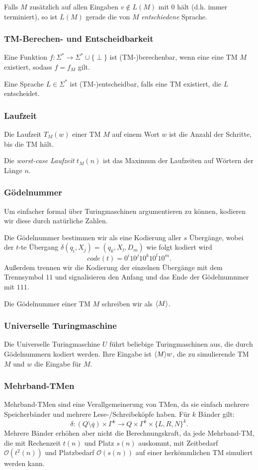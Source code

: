 \documentclass[a4paper,parskip=half*,DIV=7,fontsize=11pt]{scrartcl}
\DeclarePairedDelimiter\goedel{\langle}{\rangle}
\begin{document}
Falls $M$ zusätzlich auf allen Eingaben $v \notin L(M)$ mit 0 hält (d.h. immer terminiert), so ist $L(M)$ gerade die von $M$ \emph{entschiedene} Sprache.

\subsubsection{TM-Berechen- und Entscheidbarkeit}
Eine Funktion $f : \Sigma^* \to \Sigma^* \cup \{\perp\}$ ist (TM-)berechenbar, wenn eine eine TM $M$ existiert, sodass $f = f_M$ gilt.

Eine Sprache $L \in \Sigma^*$ ist (TM-)entscheidbar, falls eine TM existiert, die $L$ entscheidet.

\subsubsection{Laufzeit}

Die Laufzeit $T_M(w)$ einer TM $M$ auf einem Wort $w$ ist die Anzahl der Schritte, bis die TM hält.

Die \emph{worst-case Laufzeit} $t_M(n)$ ist das Maximum der Laufzeiten auf Wörtern der Länge $n$.

\subsubsection{Gödelnummer}
Um einfacher formal über Turingmaschinen argumentieren zu können, kodieren wir diese durch natürliche Zahlen.

Die Gödelnummer bestimmen wir als eine Kodierung aller $s$ Übergänge, wobei der $t$-te Übergang $\delta(q_i, X_j) = (q_k, X_l, D_m)$ wie folgt kodiert wird $$code(t) = 0^i 10^j 10^k 10^l 10^m.$$ Außerdem trennen wir die Kodierung der einzelnen Übergänge mit dem Trennsymbol $11$ und signalisieren den Anfang und das Ende der Gödelnumnmer mit $111$.

Die Gödelnummer einer TM $M$ schreiben wir als $\goedel{M}$.

\subsubsection{Universelle Turingmaschine}
Die Universelle Turingmaschine $U$ führt beliebige Turingmaschinen aus, die durch Gödelnummern kodiert werden. Ihre Eingabe ist $\goedel{M} w$, die zu simulierende TM $M$ und $w$ die Eingabe für $M$.

\subsubsection{Mehrband-TMen}
Mehrband-TMen sind eine Verallgemeinerung von TMen, da sie einfach mehrere Speicherbänder und mehrere Lese-/Schreibeköpfe haben. Für $k$ Bänder gilt: 
\[\delta : (Q \setminus \overline{q}) \times \Gamma^k \to Q \times \Gamma^k \times \{L,R,N\}^k.\]
Mehrere Bänder erhöhen aber nicht die Berechnungskraft, da jede Mehrband-TM, die mit Rechenzeit $t(n)$ und Platz $s(n)$ auskommt, mit Zeitbedarf $\mathcal{O}(t^2(n))$ und Platzbedarf $\mathcal{O}(s(n))$ auf einer herkömmlichen TM simuliert werden kann. 
\end{document}
